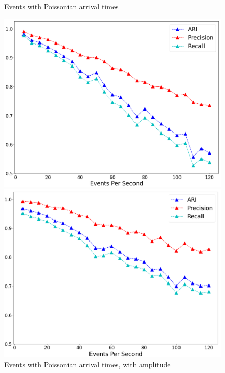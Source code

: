 \documentclass{scrreprt}
\begin{document}
\begin{figure}[h]
        \centering
    \begin{minipage}{0.47\textwidth}
        \centering
        \caption{\label{fig:perf_time}Events with Poissonian arrival times}
        \includegraphics[width=\textwidth]{plots/performance_gamma_time.png}
    \end{minipage}
    \hfill
    \begin{minipage}{0.47\textwidth}
        \centering
        \caption{\label{fig:perf_phase}Events with Poissonian arrival times, with amplitude}
        \includegraphics[width=\textwidth]{plots/performance_gamma_phase.png}
    \end{minipage}
\end{figure}
\end{document}
